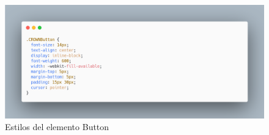 \begin{figure}[H]
    \includegraphics[width=1\textwidth]{./Imagenes/image26.png}
    \caption[Estilos del elemento Button]{Estilos del elemento Button}
    \end{figure}
\newline
\newline




